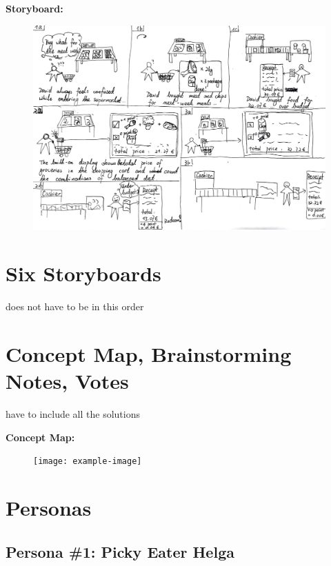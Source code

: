 \documentclass[a4paper,10pt,oneside]{scrreprt}
\begin{document}
				\noindent \textbf{Storyboard:}\\

				\begin{figure}[h]
					\centering
					\includegraphics[scale=0.4, clip, trim={0em 0em 0em 0em}]{images/s5.jpg}
				\end{figure}

			\clearpage

		\bigskip

	\section{Six Storyboards}
		does not have to be in this order

	\section{Concept Map, Brainstorming Notes, Votes}
		have to include all the solutions

			\noindent \textbf{Concept Map:}\\

			\begin{figure}[H]
				\centering
				\texttt{[image: example-image]}
			\end{figure}


	\section{Personas}

		\subsection{Persona \#1: Picky Eater Helga}
\end{document}

